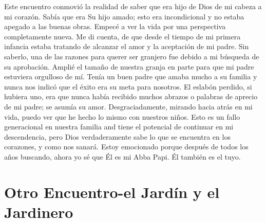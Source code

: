 \documentclass[twoside, 12pt]{book}
\begin{document}
Este encuentro conmovió la realidad de saber que era hijo de Dios de mi cabeza a mi corazón.  Sabía que era Su hijo amado; esto era incondicional y no estaba apegado a las buenas obras.  Empecé a ver la vida por una perspectiva completamente nueva.  Me di cuenta, de que desde el tiempo de mi primera infancia estaba tratando de alcanzar el amor y la aceptación de mi padre.  Sin saberlo, una de las razones para querer ser granjero fue debido a mi búsqueda de su aprobación.  Amplié el tamaño de nuestra granja en parte para que mi padre estuviera orgulloso de mí.  Tenía un buen padre que amaba mucho a su familia y nunca nos indicó que el éxito era su meta para nosotros.  El eslabón perdido, si hubiera uno, era que nunca había recibido muchos abrazos o palabras de aprecio de mi padre; se asumía su amor.  Desgraciadamente, mirando hacia atrás en mi vida, puedo ver que he hecho lo mismo con nuestros niños.  Esto es un fallo generacional en nuestra familia and tiene el potencial de continuar en mi descendencia, pero Dios verdaderamente sabe lo que se encuentra en los corazones, y como nos sanará.  Estoy emocionado porque después de todos los años buscando, ahora yo sé que Él es mi Abba Papi.  Él también es el tuyo.\\

\section{Otro Encuentro-el Jardín y el Jardinero}
\end{document}
